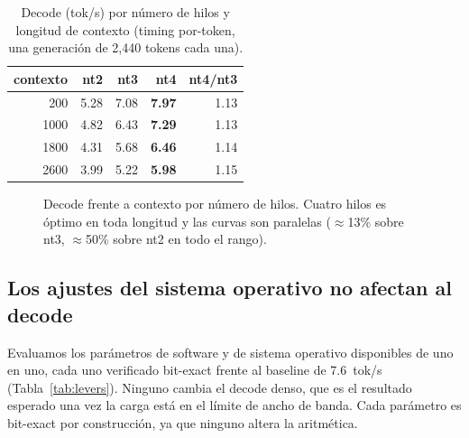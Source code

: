 \documentclass[10pt,a4paper]{article}
\begin{document}
\begin{table}[H]
\centering\small
\caption{Decode (tok/s) por número de hilos y longitud de contexto (timing por-token, una generación de 2{,}440 tokens cada una).}
\label{tab:threadctx}
\begin{tabular}{@{}rrrrr@{}}
\toprule
\textbf{contexto} & \textbf{nt2} & \textbf{nt3} & \textbf{nt4} & \textbf{nt4/nt3} \\
\midrule
200  & 5.28 & 7.08 & \textbf{7.97} & 1.13 \\
1000 & 4.82 & 6.43 & \textbf{7.29} & 1.13 \\
1800 & 4.31 & 5.68 & \textbf{6.46} & 1.14 \\
2600 & 3.99 & 5.22 & \textbf{5.98} & 1.15 \\
\bottomrule
\end{tabular}
\end{table}

\begin{figure}[H]
\centering
{}
\caption{Decode frente a contexto por número de hilos. Cuatro hilos es óptimo en toda longitud y las curvas son paralelas ($\approx$13\% sobre nt3, $\approx$50\% sobre nt2 en todo el rango).}
\label{fig:threadctx}
\end{figure}

\subsection{Los ajustes del sistema operativo no afectan al decode}
\label{sec:negatives}
Evaluamos los parámetros de software y de sistema operativo disponibles de uno en uno, cada uno verificado bit-exact frente al baseline de 7.6~tok/s (Tabla~\ref{tab:levers}). Ninguno cambia el decode denso, que es el resultado esperado una vez la carga está en el límite de ancho de banda. Cada parámetro es bit-exact por construcción, ya que ninguno altera la aritmética.
\end{document}

